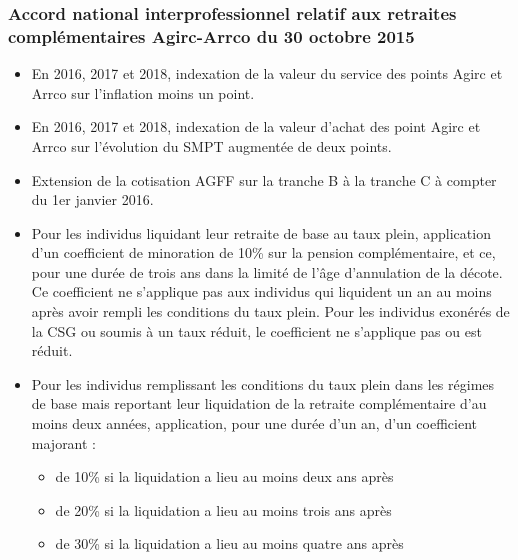 \subsubsection{Accord national interprofessionnel relatif aux retraites complémentaires Agirc-Arrco du 30 octobre 2015}
\begin{itemize}
   \item En 2016, 2017 et 2018, indexation de la valeur du service des points Agirc et Arrco sur l'inflation moins un point.
   \item En 2016, 2017 et 2018, indexation de la valeur d'achat des point Agirc et Arrco sur l'évolution du SMPT augmentée de deux points.
   \item Extension de la cotisation AGFF sur la tranche B à la tranche C à compter du 1er janvier 2016.
   \item Pour les individus liquidant leur retraite de base au taux plein, application d'un coefficient de minoration de 10\% sur la pension complémentaire, et ce, pour une durée de trois ans dans la limité de l'âge d'annulation de la décote. Ce coefficient ne s'applique pas aux individus qui liquident un an au moins après avoir rempli les conditions du taux plein. Pour les individus exonérés de la CSG ou soumis à un taux réduit, le coefficient ne s'applique pas ou est réduit.
   \item Pour les individus remplissant les conditions du taux plein dans les régimes de base mais reportant leur liquidation de la retraite complémentaire d'au moins deux années, application, pour une durée d'un an, d'un coefficient majorant :
   \begin{itemize}
   \item de 10\% si la liquidation a lieu au moins deux ans après
   \item de 20\% si la liquidation a lieu au moins trois ans après
   \item de 30\% si la liquidation a lieu au moins quatre ans après
   \end{itemize}
\end{itemize}



